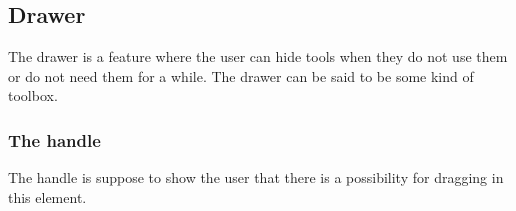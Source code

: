 \subsection{Drawer}
\label{GUI:drawer}

The drawer is a feature where the user can hide tools when they do not use them or do not need them for a while. The drawer can be said to be some kind of toolbox. 

\subsubsection{The handle}
The handle is suppose to show the user that there is a possibility for dragging in this element.
